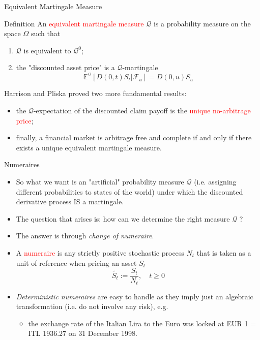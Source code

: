 \documentclass{beamer}
\begin{document}
\begin{frame}{Equivalent Martingale Measure}
	\begin{block}{Definition}
	An \textcolor{red}{equivalent martingale measure} $\mathcal{Q}$ is a probability measure on the space $\Omega$ such that
	\begin{enumerate}
		\item $\mathcal{Q}$ is equivalent to $\mathcal{Q}^{0}$;
		\item the "discounted asset price" is a $\mathcal{Q}$-martingale
		\begin{equation}
			\mathbb{E}^\mathcal{Q}[D(0,t)S_t|\mathcal{F}_u] = D(0,u)S_u
		\end{equation}
	\end{enumerate}
	\end{block}
Harrison and Pliska proved two more fundamental results:
\begin{itemize}
	\item the $\mathcal{Q}$-expectation of the discounted claim payoff is the \textcolor{red}{unique no-arbitrage price};
	\item finally, a financial market is arbitrage free and complete if and only if there exists a unique equivalent martingale measure.
\end{itemize}
\end{frame}

\begin{frame}{Numeraires}
	\begin{itemize}
		\item So what we want is an "artificial" probability measure $\mathcal{Q}$ (i.e. assigning different probabilities to states of the world) under which the discounted derivative process IS a martingale.
		\item The question that arises is: how can we determine the right measure $\mathcal{Q}$ ?
		\item The answer is through \emph{change of numeraire}.
		\item A \textcolor{red}{numeraire} is any strictly positive stochastic process $N_t$ that is taken as a unit of reference when pricing an asset $S_t$
		\begin{equation*}
			\tilde{S_t}:=\frac{S_t}{N_t}, \quad t \ge 0
		\end{equation*}
		\item \emph{Deterministic numeraires} are easy to handle as they imply just an algebraic transformation (i.e. do not involve any risk), e.g.
		\begin{itemize}
			\item the exchange rate of the Italian Lira to the Euro was locked at EUR 1 = ITL 1936.27 on 31 December 1998.
		\end{itemize}
	\end{itemize}
\end{frame}
\end{document}

